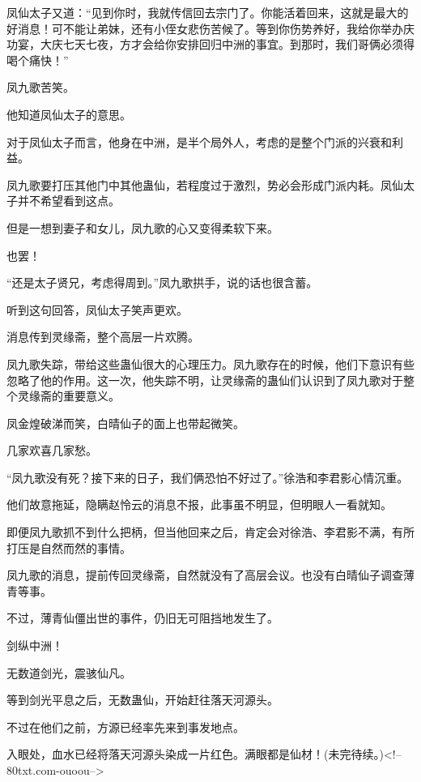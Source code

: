 \begin{this_body}
凤仙太子又道：“见到你时，我就传信回去宗门了。你能活着回来，这就是最大的好消息！可不能让弟妹，还有小侄女悲伤苦候了。等到你伤势养好，我给你举办庆功宴，大庆七天七夜，方才会给你安排回归中洲的事宜。到那时，我们哥俩必须得喝个痛快！”

凤九歌苦笑。

他知道凤仙太子的意思。

对于凤仙太子而言，他身在中洲，是半个局外人，考虑的是整个门派的兴衰和利益。

凤九歌要打压其他门中其他蛊仙，若程度过于激烈，势必会形成门派内耗。凤仙太子并不希望看到这点。

但是一想到妻子和女儿，凤九歌的心又变得柔软下来。

也罢！

“还是太子贤兄，考虑得周到。”凤九歌拱手，说的话也很含蓄。

听到这句回答，凤仙太子笑声更欢。

消息传到灵缘斋，整个高层一片欢腾。

凤九歌失踪，带给这些蛊仙很大的心理压力。凤九歌存在的时候，他们下意识有些忽略了他的作用。这一次，他失踪不明，让灵缘斋的蛊仙们认识到了凤九歌对于整个灵缘斋的重要意义。

凤金煌破涕而笑，白晴仙子的面上也带起微笑。

几家欢喜几家愁。

“凤九歌没有死？接下来的日子，我们俩恐怕不好过了。”徐浩和李君影心情沉重。

他们故意拖延，隐瞒赵怜云的消息不报，此事虽不明显，但明眼人一看就知。

即便凤九歌抓不到什么把柄，但当他回来之后，肯定会对徐浩、李君影不满，有所打压是自然而然的事情。

凤九歌的消息，提前传回灵缘斋，自然就没有了高层会议。也没有白晴仙子调查薄青等事。

不过，薄青仙僵出世的事件，仍旧无可阻挡地发生了。

剑纵中洲！

无数道剑光，震骇仙凡。

等到剑光平息之后，无数蛊仙，开始赶往落天河源头。

不过在他们之前，方源已经率先来到事发地点。

入眼处，血水已经将落天河源头染成一片红色。满眼都是仙材！(未完待续。)<!--80txt.com-ouoou-->

\end{this_body}

